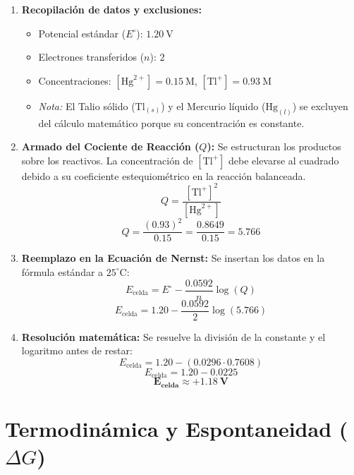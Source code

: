 \documentclass[letterpaper, 12pt, twoside]{article}
\begin{document}
\begin{enumerate}[leftmargin=15pt, itemsep=0.3em]
\vspace{0.2cm}
    \item \textbf{Recopilación de datos y exclusiones:}
    \begin{itemize}[leftmargin=15pt, topsep=2pt, itemsep=0pt]
        \item Potencial estándar ($E^\circ$): $1.20\ \text{V}$
        \item Electrones transferidos ($n$): $2$
        \item Concentraciones: $[\mathrm{Hg}^{2+}] = 0.15\ \text{M}$, $[\mathrm{Tl}^+] = 0.93\ \text{M}$
        \item \textit{Nota:} El Talio sólido ($\mathrm{Tl}_{(s)}$) y el Mercurio líquido ($\mathrm{Hg}_{(l)}$) se excluyen del cálculo matemático porque su concentración es constante.
    \end{itemize}

\vspace{0.2cm}
    \item \textbf{Armado del Cociente de Reacción ($Q$):}
    Se estructuran los productos sobre los reactivos. La concentración de $[\mathrm{Tl}^+]$ debe elevarse al cuadrado debido a su coeficiente estequiométrico en la reacción balanceada.
    $$ Q = \frac{[\mathrm{Tl}^+]^2}{[\mathrm{Hg}^{2+}]} $$
    $$ Q = \frac{(0.93)^2}{0.15} = \frac{0.8649}{0.15} = 5.766 $$

\vspace{0.2cm}
    \item \textbf{Reemplazo en la Ecuación de Nernst:}
    Se insertan los datos en la fórmula estándar a $25^\circ\text{C}$:
    $$ E_{\text{celda}} = E^\circ - \frac{0.0592}{n} \log(Q) $$
    $$ E_{\text{celda}} = 1.20 - \frac{0.0592}{2} \log(5.766) $$

\vspace{0.2cm}
    \item \textbf{Resolución matemática:}
    Se resuelve la división de la constante y el logaritmo antes de restar:
    $$ E_{\text{celda}} = 1.20 - (0.0296 \cdot 0.7608) $$
    $$ E_{\text{celda}} = 1.20 - 0.0225 $$
    $$ \mathbf{E_{\text{celda}} \approx +1.18\ \text{V}} $$
\end{enumerate}

\section*{Termodinámica y Espontaneidad ($\Delta G$)}
\end{document}
